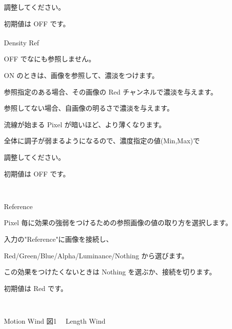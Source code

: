 \documentclass[a4paper,12pt]{article}
\begin{document}
調整してください。\par
初期値は OFF です。\\
\\
Density Ref\par
OFF でなにも参照しません。\par
ON のときは、画像を参照して、濃淡をつけます。\par
参照指定のある場合、その画像の Red チャンネルで濃淡を与えます。\par
参照してない場合、自画像の明るさで濃淡を与えます。\par
流線が始まる Pixel が暗いほど、より薄くなります。\par
全体に調子が弱まるようになるので、濃度指定の値(Min,Max)で\par
調整してください。\par
初期値は OFF です。

\newpage

\thispagestyle{empty}

\ \vspace{1.3em}
\par
\noindent Reference\par
Pixel 毎に効果の強弱をつけるための参照画像の値の取り方を選択します。\par
入力の"Reference"に画像を接続し、\par
Red/Green/Blue/Alpha/Luminance/Nothing から選びます。\par
この効果をつけたくないときは Nothing を選ぶか、接続を切ります。\par
初期値は Red です。

\newpage

\thispagestyle{empty}

\ \vspace{-0.2em}
\par
\noindent Motion Wind 図1 \ \ Length Wind
\end{document}
